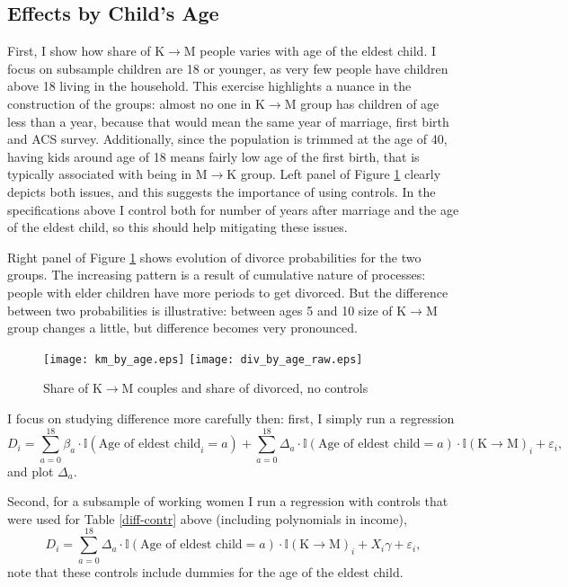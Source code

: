 \documentclass[12pt,letter]{article}
\newcommand{\I}{\mathbb{I}}
\begin{document}
\subsection{Effects by Child's Age}
First, I show how share of K$\to$M people varies with age of the eldest child. I focus on subsample children are 18 or younger, as very few people have children above 18 living in the household. This exercise highlights a nuance in the construction of the groups: almost no one in K$\to$M group has children of age less than a year, because that would mean the same year of marriage, first birth and ACS survey. Additionally, since the population is trimmed at the age of 40, having kids around age of 18 means fairly low age of the first birth, that is typically associated with being in M$\to$K group. Left panel of Figure \ref{pics-raw} clearly depicts both issues, and this suggests the importance of using controls. In the specifications above I control both for number of years after marriage and the age of the eldest child, so this should help mitigating these issues.

Right panel of Figure \ref{pics-raw} shows evolution of divorce probabilities for the two groups. The increasing pattern is a result of cumulative nature of processes: people with elder children have more periods to get divorced. But the difference between two probabilities is illustrative: between ages 5 and 10 size of K$\to$M group changes a little, but difference becomes very pronounced.

\begin{figure}[h!]
\texttt{[image: km\_by\_age.eps]}
\texttt{[image: div\_by\_age\_raw.eps]}
\caption{Share of K$\to$M couples and share of divorced, no controls\label{pics-raw}}
\end{figure}

I focus on studying difference more carefully then: first, I simply run a regression
\[D_i = \sum_{a=0}^{18} \beta_a \cdot \I(\text{Age of eldest child}_i = a) +  \sum_{a=0}^{18} \Delta_a \cdot \I(\text{Age of eldest child} = a)\cdot \I(\text{K$\to$M})_i + \varepsilon_i,\]
and plot $\Delta_a$.

Second, for a subsample of working women I run a regression with controls that were used for Table \ref{diff-contr} above (including polynomials in income),
\[D_i = \sum_{a=0}^{18} \Delta_a \cdot \I(\text{Age of eldest child} = a)\cdot \I(\text{K$\to$M})_i + X_i\gamma + \varepsilon_i,\]
note that these controls include dummies for the age of the eldest child.
\end{document}
